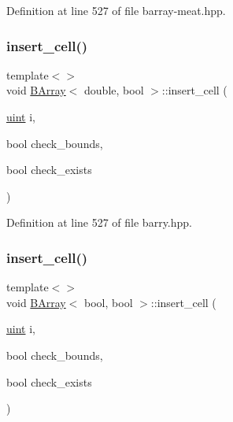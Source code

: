Definition at line 527 of file barray-\/meat.\+hpp.

\mbox{\label{class_b_array_a65aaf8f78714cd94616cf826b3eef6e1}} 
\subsubsection{\texorpdfstring{insert\+\_\+cell()}{insert\_cell()}\hspace{0.1cm}{\footnotesize\ttfamily [8/10]}}
{\footnotesize\ttfamily template$<$$>$ \\
void \hyperlink{class_b_array}{B\+Array}$<$ double, bool $>$\+::insert\+\_\+cell (\begin{DoxyParamCaption}\item[{\hyperlink{typedefs_8hpp_a91ad9478d81a7aaf2593e8d9c3d06a14}{uint}}]{i,  }\item[{bool}]{check\+\_\+bounds,  }\item[{bool}]{check\+\_\+exists }\end{DoxyParamCaption})\hspace{0.3cm}{\ttfamily [inline]}}



Definition at line 527 of file barry.\+hpp.

\mbox{\label{class_b_array_a9a554db909a326d9110caa1d050f33e4}} 
\subsubsection{\texorpdfstring{insert\+\_\+cell()}{insert\_cell()}\hspace{0.1cm}{\footnotesize\ttfamily [9/10]}}
{\footnotesize\ttfamily template$<$$>$ \\
void \hyperlink{class_b_array}{B\+Array}$<$ bool, bool $>$\+::insert\+\_\+cell (\begin{DoxyParamCaption}\item[{\hyperlink{typedefs_8hpp_a91ad9478d81a7aaf2593e8d9c3d06a14}{uint}}]{i,  }\item[{bool}]{check\+\_\+bounds,  }\item[{bool}]{check\+\_\+exists }\end{DoxyParamCaption})\hspace{0.3cm}{\ttfamily [inline]}}



